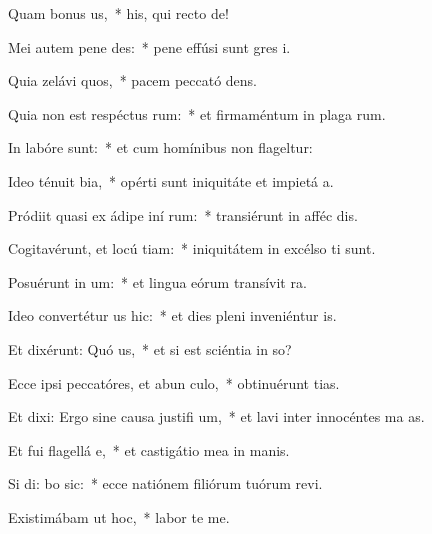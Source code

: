 \item Quam bonus  us,~* his, qui recto  de!
\item Mei autem pene   des:~* pene effúsi sunt gres i.
\item Quia zelávi  quos,~* pacem peccató dens.
\item Quia non est respéctus  rum:~* et firmaméntum in plaga rum.
\item In labóre   sunt:~* et cum homínibus non flageltur:
\item Ideo ténuit  bia,~* opérti sunt iniquitáte et impietá a.
\item Pródiit quasi ex ádipe iní rum:~* transiérunt in afféc dis.
\item Cogitavérunt, et locú  tiam:~* iniquitátem in excélso ti sunt.
\item Posuérunt in   um:~* et lingua eórum transívit  ra.
\item Ideo convertétur  us hic:~* et dies pleni inveniéntur  is.
\item Et dixérunt: Quó  us,~* et si est sciéntia in so?
\item Ecce ipsi peccatóres, et abun  culo,~* obtinuérunt tias.
\item Et dixi: Ergo sine causa justifi  um,~* et lavi inter innocéntes ma as.
\item Et fui flagellá  e,~* et castigátio mea in manis.
\item Si di: bo sic:~* ecce natiónem filiórum tuórum revi.
\item Existimábam ut  hoc,~* labor  te me.

